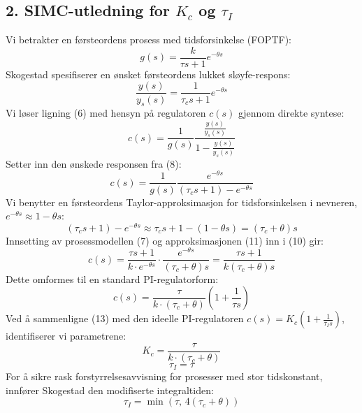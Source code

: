 \documentclass[11pt, a4paper]{article}
\begin{document}
\subsection*{2. SIMC-utledning for $K_c$ og $\tau_I$}
Vi betrakter en førsteordens prosess med tidsforsinkelse (FOPTF):
\begin{equation}
    g(s) = \frac{k}{\tau s + 1} e^{-\theta s}
\end{equation}
Skogestad spesifiserer en ønsket førsteordens lukket sløyfe-respons:
\begin{equation}
    \frac{y(s)}{y_s(s)} = \frac{1}{\tau_c s + 1} e^{-\theta s}
\end{equation}
Vi løser ligning (6) med hensyn på regulatoren $c(s)$ gjennom direkte syntese:
\begin{equation}
    c(s) = \frac{1}{g(s)} \frac{\frac{y(s)}{y_s(s)}}{1 - \frac{y(s)}{y_s(s)}}
\end{equation}
Setter inn den ønskede responsen fra (8):
\begin{equation}
    c(s) = \frac{1}{g(s)} \frac{e^{-\theta s}}{(\tau_c s + 1) - e^{-\theta s}}
\end{equation}
Vi benytter en førsteordens Taylor-approksimasjon for tidsforsinkelsen i nevneren, $e^{-\theta s} \approx 1 - \theta s$:
\begin{equation}
    (\tau_c s + 1) - e^{-\theta s} \approx \tau_c s + 1 - (1 - \theta s) = (\tau_c + \theta)s
\end{equation}
Innsetting av prosessmodellen (7) og approksimasjonen (11) inn i (10) gir:
\begin{equation}
    c(s) = \frac{\tau s + 1}{k\cdot e^{-\theta s}} \cdot \frac{e^{-\theta s}}{(\tau_c + \theta)s} = \frac{\tau s + 1}{k(\tau_c + \theta)s}
\end{equation}
Dette omformes til en standard PI-regulatorform:
\begin{equation}
    c(s) = \frac{\tau}{k\cdot(\tau_c + \theta)} \left( 1 + \frac{1}{\tau s} \right)
\end{equation}
Ved å sammenligne (13) med den ideelle PI-regulatoren $c(s) = K_c \left( 1 + \frac{1}{\tau_I s} \right)$, identifiserer vi parametrene:
\begin{equation}
    K_c = \frac{\tau}{k\cdot(\tau_c + \theta)}
\end{equation}
\begin{equation}
    \tau_I = \tau
\end{equation}
For å sikre rask forstyrrelsesavvisning for prosesser med stor tidskonstant, innfører Skogestad den modifiserte integraltiden:
\begin{equation}
    \tau_I = \min(\tau, \, 4(\tau_c + \theta))
\end{equation}
\end{document}
